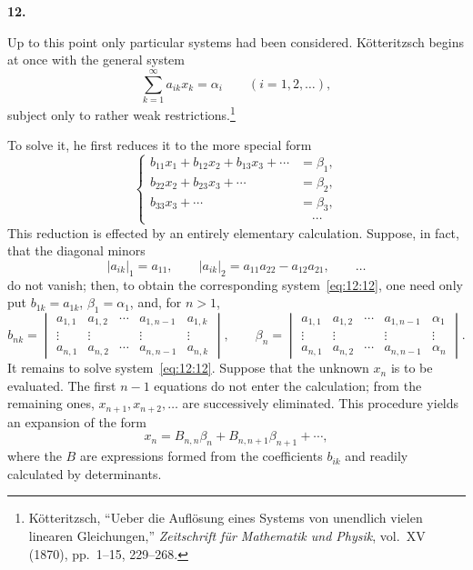 \documentclass[
  paper=b5,
  fontsize=13pt,
  twoside=true,
  open=any,
  bookmarkpackage=false,
  chapterprefix=true,
  headings=normal
]{scrbook}
\theoremstyle{definition}
\newcommand{\numberedparagraph}[1]{%
  \par\medskip\phantomsection\label{sec:#1}%
  \noindent\textbf{#1.}\enspace
}
\begin{document}
\numberedparagraph{12}
Up to this point only particular systems had been considered. K\"otteritzsch begins at once with the general system
\begin{equation}
  \sum_{k=1}^{\infty}a_{ik}x_k=\alpha_i
  \qquad(i=1,2,\ldots),
  \tag{11}\label{eq:12:11}
\end{equation}
subject only to rather weak restrictions.\footnote{K\"otteritzsch, ``Ueber die Aufl\"osung eines Systems von unendlich vielen linearen Gleichungen,'' \emph{Zeitschrift f\"ur Mathematik und Physik}, vol.~XV (1870), pp.~1--15, 229--268.}

To solve it, he first reduces it to the more special form
\begin{equation}
\left\{
\begin{aligned}
 b_{11}x_1+b_{12}x_2+b_{13}x_3+\cdots&=\beta_1,\\
 b_{22}x_2+b_{23}x_3+\cdots&=\beta_2,\\
 b_{33}x_3+\cdots&=\beta_3,\\
 &\hspace{1em}\cdots
\end{aligned}
\right.
\tag{12}\label{eq:12:12}
\end{equation}
This reduction is effected by an entirely elementary calculation. Suppose, in fact, that the diagonal minors
\[
  |a_{ik}|_1=a_{11},\qquad
  |a_{ik}|_2=a_{11}a_{22}-a_{12}a_{21},\qquad\ldots
\]
do not vanish; then, to obtain the corresponding system~\eqref{eq:12:12},
one need only put $b_{1k}=a_{1k}$, $\beta_1=\alpha_1$, and, for $n>1$,
\[
 b_{nk}=
 \begin{vmatrix}
 a_{1,1}&a_{1,2}&\cdots&a_{1,n-1}&a_{1,k}\\
 \vdots&\vdots&&\vdots&\vdots\\
 a_{n,1}&a_{n,2}&\cdots&a_{n,n-1}&a_{n,k}
 \end{vmatrix},
 \qquad
 \beta_n=
 \begin{vmatrix}
 a_{1,1}&a_{1,2}&\cdots&a_{1,n-1}&\alpha_1\\
 \vdots&\vdots&&\vdots&\vdots\\
 a_{n,1}&a_{n,2}&\cdots&a_{n,n-1}&\alpha_n
 \end{vmatrix}.
\]
It remains to solve system~\eqref{eq:12:12}. Suppose that the unknown $x_n$ is to be evaluated. The first $n-1$ equations do not enter the calculation; from the remaining ones, $x_{n+1},x_{n+2},\ldots$ are successively eliminated. This procedure yields an expansion of the form
\[
  x_n=B_{n,n}\beta_n+B_{n,n+1}\beta_{n+1}+\cdots,
\]
where the $B$ are expressions formed from the coefficients $b_{ik}$ and readily calculated by determinants.
\end{document}
